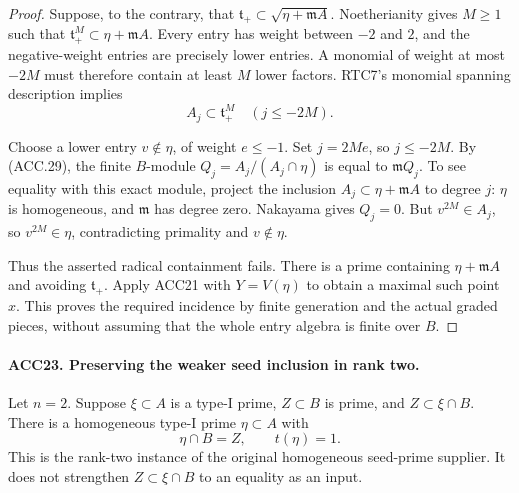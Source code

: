 \begin{proof}
Suppose, to the contrary, that
\(\mathfrak t_+\subset\sqrt{\eta+\mathfrak m A}\).
Noetherianity gives \(M\ge1\) such that
\(\mathfrak t_+^M\subset\eta+\mathfrak m A\).
Every entry has weight between \(-2\) and \(2\), and the
negative-weight entries are precisely lower entries.  A monomial
of weight at most \(-2M\) must therefore contain at least
\(M\) lower factors.  RTC7's monomial spanning description
implies
\[
                   A_j\subset\mathfrak t_+^M
                           \quad(j\le-2M).               \tag{ACC.29}
\]

Choose a lower entry \(v\notin\eta\), of weight \(e\le-1\).
Set \(j=2Me\), so \(j\le-2M\).  By (ACC.29), the finite
\(B\)-module \(Q_j=A_j/(A_j\cap\eta)\) is equal to
\(\mathfrak mQ_j\).  To see equality with this exact module,
project the inclusion \(A_j\subset\eta+\mathfrak m A\)
to degree \(j\): \(\eta\) is homogeneous, and
\(\mathfrak m\) has degree zero.  Nakayama gives \(Q_j=0\).
But \(v^{2M}\in A_j\), so \(v^{2M}\in\eta\), contradicting
primality and \(v\notin\eta\).

Thus the asserted radical containment fails.  There is a prime
containing \(\eta+\mathfrak m A\) and avoiding
\(\mathfrak t_+\).  Apply ACC21 with \(Y=V(\eta)\) to
obtain a maximal such point \(x\).  This proves the required
incidence by finite generation and the actual graded pieces, without
assuming that the whole entry algebra is finite over \(B\).
\end{proof}

\paragraph{ACC23. Preserving the weaker seed inclusion in rank two.}
\label{claim:ACC23}
Let \(n=2\).  Suppose \(\xi\subset A\) is a type-I prime,
\(Z\subset B\) is prime, and \(Z\subset\xi\cap B\).
There is a homogeneous type-I prime \(\eta\subset A\) with
\[
                         \eta\cap B=Z,\qquad t(\eta)=1.
                                                               \tag{ACC.30}
\]
This is the rank-two instance of the original homogeneous seed-prime
supplier.  It does not strengthen \(Z\subset\xi\cap B\) to
an equality as an input.

